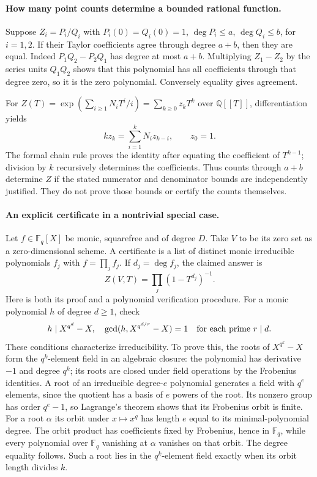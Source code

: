 \documentclass[11pt]{article}
\begin{document}
\paragraph{How many point counts determine a bounded rational function.}
Suppose $Z_i=P_i/Q_i$ with $P_i(0)=Q_i(0)=1$,
$\deg P_i\le a$, $\deg Q_i\le b$, for $i=1,2$.
If their Taylor coefficients agree through degree $a+b$, then they
are equal. Indeed $P_1Q_2-P_2Q_1$ has degree at most $a+b$.
Multiplying $Z_1-Z_2$ by the series units $Q_1Q_2$ shows that
this polynomial has all coefficients through that degree zero,
so it is the zero polynomial. Conversely equality gives agreement.

For $Z(T)=\exp(\sum_{i\ge1}N_iT^i/i)=\sum_{k\ge0}z_kT^k$
over $\mathbb Q[[T]]$, differentiation yields
\[
kz_k=\sum_{i=1}^k N_i z_{k-i},\qquad z_0=1.
\]
The formal chain rule proves the identity after equating the coefficient
of $T^{k-1}$; division by $k$ recursively determines the coefficients.
Thus counts through $a+b$ determine $Z$ if the stated numerator
and denominator bounds are independently justified. They do not
prove those bounds or certify the counts themselves.

\paragraph{An explicit certificate in a nontrivial special case.}
Let $f\in\mathbb F_q[X]$ be monic, squarefree and of degree $D$.
Take $V$ to be its zero set as a zero-dimensional scheme. A certificate
is a list of distinct monic irreducible polynomials $f_j$ with
$f=\prod_j f_j$. If $d_j=\deg f_j$, the claimed answer is
\[
Z(V,T)=\prod_j(1-T^{d_j})^{-1}.
\]
Here is both its proof and a polynomial verification procedure.
For a monic polynomial $h$ of degree $d\ge1$, check
\[
h\mid X^{q^d}-X,
\quad
\gcd(h,X^{q^{d/r}}-X)=1
\quad\hbox{for each prime }r\mid d.
\]
These conditions characterize irreducibility. To prove this, the
roots of $X^{q^k}-X$ form the $q^k$-element field in an algebraic
closure: the polynomial has derivative $-1$ and degree $q^k$;
its roots are closed under field operations by the Frobenius identities.
A root of an irreducible degree-$e$ polynomial generates a field with
$q^e$ elements, since the quotient has a basis of $e$ powers of the
root. Its nonzero group has order $q^e-1$, so Lagrange's theorem
shows that its Frobenius orbit is finite. For a root $\alpha$ its
orbit under $x\mapsto x^q$ has length $e$
equal to its minimal-polynomial degree. The orbit product has coefficients
fixed by Frobenius, hence in $\mathbb F_q$, while every polynomial
over $\mathbb F_q$ vanishing at $\alpha$ vanishes on that orbit.
The degree equality follows. Such a root lies in the $q^k$-element
field exactly when its orbit length divides $k$.
\end{document}
